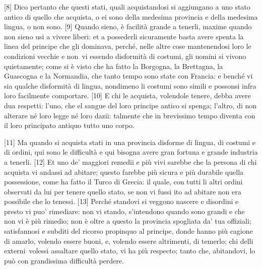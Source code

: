 {[}8{]} Dico pertanto che questi stati, quali acquistandosi si
aggiungano a uno stato antico di quello che acquista, o ei sono della
medesima provincia e della medesima lingua, o non sono. {[}9{]} Quando
sieno, è facilità grande a tenerli, maxime quando non sieno usi a vivere
liberi: et a possederli sicuramente basta avere spenta la linea del
principe che gli dominava, perché, nelle altre cose mantenendosi loro le
condizioni vecchie e non\est\ vi essendo disformità di costumi, gli uomini si
vivono quietamente; come si è visto che ha fatto la Borgogna, la
Brettagna, la Guascogna e la Normandia, che tanto tempo sono state con
Francia: e benché vi sia qualche disformità di lingua, nondimeno li
costumi sono simili e possonsi infra loro facilmente comportare.
{[}10{]} E chi le acquista, volendole tenere, debba avere dua respetti:
l'uno, che el sangue del loro principe antico si spenga; l'altro, di non
alterare né loro legge né loro dazii: talmente che in brevissimo tempo
diventa con il loro principato antiquo tutto uno corpo.

{[}11{]} Ma quando si acquista stati in una provincia disforme di
lingua, di costumi e di ordini, qui sono le difficultà e qui bisogna
avere gran fortuna e grande industria a tenerli. {[}12{]} Et uno de'
maggiori remedii e più vivi sarebbe che la persona di chi acquista vi
andassi ad abitare; questo farebbe più sicura e più durabile quella
possessione, come ha fatto il Turco di Grecia: il quale, con tutti li
altri ordini observati da lui per tenere quello stato, se non vi fussi
ito ad abitare non era possibile che lo tenessi. {[}13{]} Perché
standovi si veggono nascere e disordini e presto vi puo' rimediare: non
vi stando, s'intendono quando sono grandi e che non vi è più rimedio;
non è oltre a questo la provincia spogliata da' tua offiziali;
satisfannosi e subditi del ricorso propinquo al principe, donde hanno
più cagione di amarlo, volendo essere buoni, e, volendo essere
altrimenti, di temerlo; chi delli externi\est\ volessi assaltare quello
stato, vi ha più respecto; tanto che, abitandovi, lo può con grandissima difficultà perdere.

